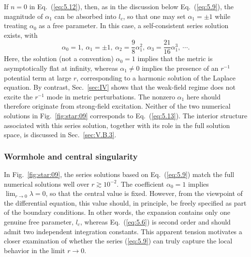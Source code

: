 \documentclass[aps,prd,twocolumn]{revtex4-2}
\begin{document}
If $n=0$ in Eq.~(\ref{eq:5.12}), then, as in the discussion below Eq.~(\ref{eq:5.9}), the magnitude of $\alpha_1$ can be absorbed into $l_c$, so that one may set $\alpha_1=\pm1$ while treating $\alpha_0$ as a free parameter. In this case, a self-consistent series solution exists, with
\begin{equation}\label{eq:5.13}
  \alpha_0=1, \
  \alpha_1=\pm1, \ 
  \alpha_2=\frac{9}{8}\alpha_1^2, \
  \alpha_3=\frac{21}{16}\alpha_1^3, \
  \cdots.
\end{equation}
Here, the solution (not a convention) $\alpha_0=1$ implies that the metric is asymptotically flat at infinity, whereas $\alpha_1\neq0$ implies the presence of an $r^{-1}$ potential term at large $r$, corresponding to a harmonic solution of the Laplace equation. By contrast, Sec.~\ref{sec:IV} shows that the weak-field regime does not excite the $r^{-1}$ mode in metric perturbations. The nonzero $\alpha_1$ here should therefore originate from strong-field excitation. Neither of the two numerical solutions in Fig.~\ref{fig:star:09} corresponds to Eq.~(\ref{eq:5.13}). The interior structure associated with this series solution, together with its role in the full solution space, is discussed in Sec.~\ref{sec:V.B.3}.

\subsubsection{Wormhole and central singularity}\label{sec:V.B.2}
In Fig.~\ref{fig:star:09}, the series solutions based on Eq.~(\ref{eq:5.9}) match the full numerical solutions well over $r\gtrsim10^{-2}$. The coefficient $\alpha_0=1$ implies $\lim_{r\rightarrow0}\lambda=0$, so that the central value is fixed. However, from the viewpoint of the differential equation, this value should, in principle, be freely specified as part of the boundary conditions. In other words, the expansion contains only one genuine free parameter, $l_c$, whereas Eq.~(\ref{eq:5.6}) is second order and should admit two independent integration constants. This apparent tension motivates a closer examination of whether the series (\ref{eq:5.9}) can truly capture the local behavior in the limit $r\rightarrow0$.
\end{document}

